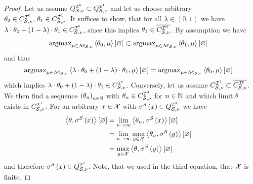 \begin{proof}
    \proofrightsymbol Let us assume $Q^{\mathcal{I}^{0}}_{\mathcal{S},\nu} \subset Q^{\mathcal{I}^{1}}_{\mathcal{S},\nu}$ and let us choose arbitrary $\theta_{0}\in C_{\mathcal{S},\nu}^{\mathcal{I}^{0}},\,\theta_{1}\in C_{\mathcal{S},\nu}^{\mathcal{I}^{1}}$.
    It suffices to show, that for all $\lambda\in(0,1)$ we have $\lambda\cdot\theta_{0}+(1-\lambda)\cdot\theta_{1}\in C_{\mathcal{S},\nu}^{\mathcal{I}^{0}}$, since this implies $\theta_{1}\in\overline{C_{\mathcal{S},\nu}^{\mathcal{I}^{0}}}$.
    By assumption we have
    \begin{align*}
        \mathrm{argmax}_{\mu\in\mathcal{M}_{\mathcal{S},\nu}} \left\langle \theta_{0},\mu\right\rangle \left[ \varnothing \right] \subset  \mathrm{argmax}_{\mu\in\mathcal{M}_{\mathcal{S},\nu}} \left\langle \theta_{1},\mu\right\rangle \left[ \varnothing \right]
    \end{align*}
    and thus
    \begin{align*}
        \mathrm{argmax}_{\mu\in\mathcal{M}_{\mathcal{S},\nu}} \left\langle \lambda\cdot\theta_{0}+(1-\lambda)\cdot\theta_{1},\mu\right\rangle \left[ \varnothing \right] = \mathrm{argmax}_{\mu\in\mathcal{M}_{\mathcal{S},\nu}} \left\langle \theta_{0},\mu\right\rangle \left[ \varnothing \right]
    \end{align*}
    which implies $\lambda\cdot\theta_{0}+(1-\lambda)\cdot\theta_{1}\in C_{\mathcal{S},\nu}^{\mathcal{I}^{0}}$.
    \proofleftsymbol Conversely, let us assume $C_{\mathcal{S},\nu}^{\mathcal{I}^{1}} \subset \overline{C_{\mathcal{S},\nu}^{\mathcal{I}^{0}}}$.
    We then find a sequence $\left(\theta_{n}\right)_{n\in\mathbb{N}}$ with $\theta_{n}\in C_{\mathcal{S},\nu}^{\mathcal{I}^{0}}$ for $n\in\mathbb{N}$ and which limit $\theta$ exists in $C_{\mathcal{S},\nu}^{\mathcal{I}^{1}}$.
    For an arbitrary $x\in\mathcal{X}$ with $\sigma^{\mathcal{S}}\left(x\right)\in Q^{\mathcal{I}^{0}}_{\mathcal{S},\nu}$ we have
    \begin{align*}
        \left\langle \theta,\sigma^{\mathcal{S}}\left(x\right)\right\rangle \left[ \varnothing \right]
        &= \lim_{n\rightarrow\infty} \left\langle \theta_{n},\sigma^{\mathcal{S}}\left(x\right)\right\rangle \left[ \varnothing \right] \\
        &= \lim_{n\rightarrow\infty} \max_{y\in\mathcal{X}} \left\langle \theta_{n},\sigma^{\mathcal{S}}\left(y\right)\right\rangle \left[ \varnothing \right] \\
        &= \max_{y\in\mathcal{X}} \left\langle \theta,\sigma^{\mathcal{S}}\left(y\right)\right\rangle \left[ \varnothing \right]
    \end{align*}
    and therefore $\sigma^{\mathcal{S}}\left(x\right)\in Q^{\mathcal{I}^{1}}_{\mathcal{S},\nu}$.
    Note, that we used in the third equation, that $\mathcal{X}$ is finite.%

\end{proof}
